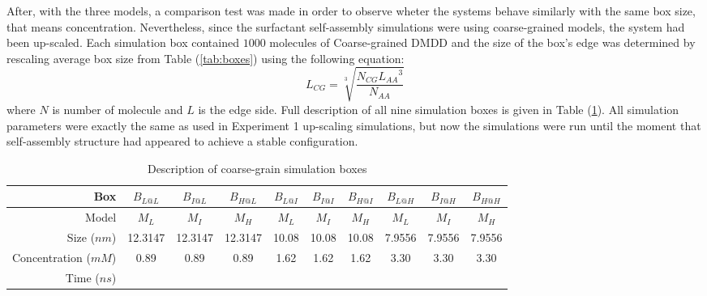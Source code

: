 \documentclass[10pt,a4paper,twoside]{article}
\begin{document}
  After, with the three models, a comparison test was made in order to observe wheter the systems behave similarly with the same box size, that means concentration. Nevertheless, since the surfactant self-assembly simulations were using coarse-grained models, the system had been up-scaled. Each simulation box contained $1000$ molecules of Coarse-grained DMDD and the size of the box's edge was determined by rescaling average box size from Table (\ref{tab:boxes}) using the following equation:  
\begin{equation}
L_{CG}=\sqrt[3]{\frac{N_{CG} {L_{AA}}^3}{N_{AA}}}
\label{eqn:bsize}
\end{equation}
where $N$ is number of molecule and $L$ is the edge side. Full description of all nine simulation boxes is given in Table (\ref{tab:cgbox}). All simulation parameters were exactly the same as used in Experiment 1 up-scaling simulations, but now the simulations were run until the moment that self-assembly structure had appeared to achieve a stable configuration.
\begin{table}[ht!] 
  \centering
\begin{threeparttable}

  \caption{Description of coarse-grain simulation boxes}

\begin{tabular}{|r|c|c|c||c|c|c||c|c|c|}
\hline
Box                  & $B_{L@L}$ & $B_{I@L}$ & $B_{H@L}$ & $B_{L@I}$ & $B_{I@I}$ & $B_{H@I}$ & $B_{L@H}$ & $B_{I@H}$ & $B_{H@H}$ \\ \hline
Model                &     $M_{L}$      &   $M_{I}$       &      $M_{H}$     &     $M_{L}$      &     $M_{I}$      &       $M_{H}$    &      $M_{L}$     &   $M_{I}$        &     $M_{H}$      \\ \hline
Size ($nm$)          &     12.3147      &      12.3147      &     12.3147      &     10.08      &      10.08          &      10.08          &      7.9556     &     7.9556     &     7.9556      \\ \hline
Concentration ($mM$) &     0.89      &     0.89      &    0.89       &    1.62       &          1.62 &     1.62      &    3.30       &     3.30      &     3.30      \\ \hline
Time ($ns$)          &           &           &           &           &           &           &           &           &           \\ \hline
\end{tabular}
  \label{tab:cgbox}%
\end{threeparttable} 
\end{table}
\end{document}
